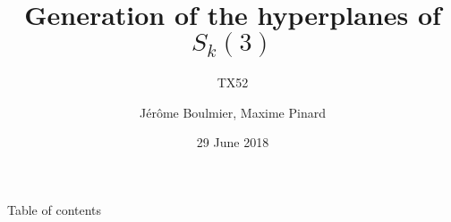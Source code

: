 \documentclass[aspectratio=169,11pt]{beamer}
\title{Generation of the hyperplanes of  \texorpdfstring{$S_k(3)$}{S\_k(3)} }
\subtitle{TX52}
\author{Jérôme Boulmier, Maxime Pinard}
\institute[UTBM]{Université de Technologie de Belfort Montbéliard}
\date[2018-06-29]{29 June 2018}
\begin{document}
	\begin{frame}
		\titlepage
	\end{frame}
	\begin{frame}{Table of contents}
		\tableofcontents
	\end{frame}
	\begin{frame}[plain]
	\end{frame}
\end{document}

